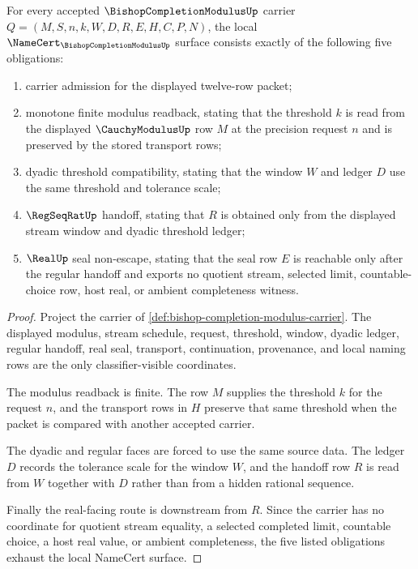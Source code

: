 \begin{theorem}
\label{thm:bishop-completion-modulus-namecert-obligations}
For every accepted $\BishopCompletionModulusUp$ carrier $Q=(M,S,n,k,W,D,R,E,H,C,P,N)$, the local $\NameCert_{\BishopCompletionModulusUp}$ surface consists exactly of the following five obligations:
\begin{enumerate}
\item carrier admission for the displayed twelve-row packet;
\item monotone finite modulus readback, stating that the threshold $k$ is read from the displayed $\CauchyModulusUp$ row $M$ at the precision request $n$ and is preserved by the stored transport rows;
\item dyadic threshold compatibility, stating that the window $W$ and ledger $D$ use the same threshold and tolerance scale;
\item $\RegSeqRatUp$ handoff, stating that $R$ is obtained only from the displayed stream window and dyadic threshold ledger;
\item $\RealUp$ seal non-escape, stating that the seal row $E$ is reachable only after the regular handoff and exports no quotient stream, selected limit, countable-choice row, host real, or ambient completeness witness.
\end{enumerate}
\end{theorem}
\begin{proof}
Project the carrier of \autoref{def:bishop-completion-modulus-carrier}. The displayed modulus, stream schedule, request, threshold, window, dyadic ledger, regular handoff, real seal, transport, continuation, provenance, and local naming rows are the only classifier-visible coordinates.

The modulus readback is finite. The row $M$ supplies the threshold $k$ for the request $n$, and the transport rows in $H$ preserve that same threshold when the packet is compared with another accepted carrier.

The dyadic and regular faces are forced to use the same source data. The ledger $D$ records the tolerance scale for the window $W$, and the handoff row $R$ is read from $W$ together with $D$ rather than from a hidden rational sequence.

Finally the real-facing route is downstream from $R$. Since the carrier has no coordinate for quotient stream equality, a selected completed limit, countable choice, a host real value, or ambient completeness, the five listed obligations exhaust the local NameCert surface.
\end{proof}

